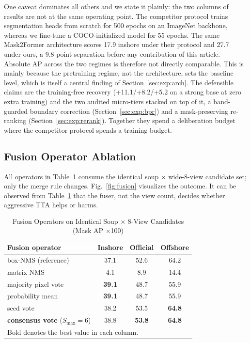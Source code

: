 One caveat dominates all others and we state it plainly: the two columns of results are not at the same operating point. The competitor protocol trains segmentation heads from scratch for 500 epochs on an ImageNet backbone, whereas we fine-tune a COCO-initialized model for 55 epochs. The same Mask2Former architecture scores 17.9 inshore under their protocol and 27.7 under ours, a 9.8-point separation before any contribution of this article. Absolute AP across the two regimes is therefore not directly comparable. This is mainly because the pretraining regime, not the architecture, sets the baseline level, which is itself a central finding of Section~\ref{sec:exp:arch}. The defensible claims are the training-free recovery (+11.1/+8.2/+5.2 on a strong base at zero extra training) and the two audited micro-tiers stacked on top of it, a band-guarded boundary correction (Section~\ref{sec:exp:bpr}) and a mask-preserving re-ranking (Section~\ref{sec:exp:rerank}). Together they spend a deliberation budget where the competitor protocol spends a training budget.

\subsection{Fusion Operator Ablation}\label{sec:exp:fusion}

All operators in Table~\ref{tab:fusion} consume the identical soup $\times$ wide-8-view candidate set; only the merge rule changes. Fig.~\ref{fig:fusion} visualizes the outcome. It can be observed from Table~\ref{tab:fusion} that the fuser, not the view count, decides whether aggressive TTA helps or harms.

\begin{table}[!t]
\caption{Fusion Operators on Identical Soup $\times$ 8-View Candidates (Mask AP $\times$100)}
\label{tab:fusion}
\centering
\begin{tabular}{lccc}
\toprule
Fusion operator & Inshore & Official & Offshore \\
\midrule
box-NMS (reference) & 37.1 & 52.6 & 64.2 \\
matrix-NMS & 4.1 & 8.9 & 14.4 \\
majority pixel vote & \textbf{39.1} & 48.7 & 55.9 \\
probability mean & \textbf{39.1} & 48.7 & 55.9 \\
seed vote & 38.2 & 53.5 & \textbf{64.8} \\
\textbf{consensus vote} ($S_{\max}=6$) & 38.8 & \textbf{53.8} & \textbf{64.8} \\
\bottomrule
\multicolumn{4}{l}{\footnotesize Bold denotes the best value in each column.}
\end{tabular}
\end{table}

